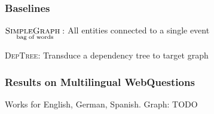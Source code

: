 \documentclass[mathserif,12pt]{beamer}
\newcommand{\hlight}[1]{{\color{blue!80} #1}}
\newcommand \deptree{\textsc{DepTree}\xspace}
\newcommand \simplegraph{\textsc{SimpleGraph}\xspace}
\newcommand \ccggraph{\textsc{CCGGraph}\xspace}
\begin{document}
\begin{frame}
\large
\frametitle{Baselines}
\hlight{$\underset{\mathrm{bag\; of\; words}}{\simplegraph:}$ }All entities connected to a single event



\vspace{2em}
\hlight{\deptree:} Transduce a dependency tree to target graph \\

\end{frame}

\begin{frame}
\frametitle{Results on Multilingual WebQuestions}
\huge Works for English, German, Spanish. Graph: TODO
\end{frame}
\end{document}
